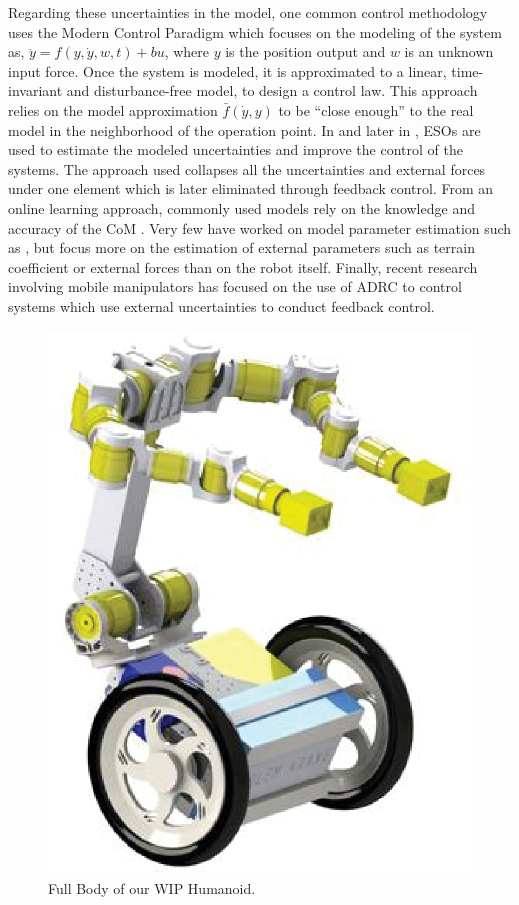 \documentclass[letterpaper, 10 pt, conference]{ieeeconf}  %
\begin{document}
Regarding these uncertainties in the model, one common control methodology uses the Modern Control Paradigm \cite{Gao2006} which focuses on the modeling of the system as, $\ddot{y} = f(y,\dot{y},w,t) + bu$, where $y$ is the position output and $w$ is an unknown input force. Once the system is modeled, it is approximated to a linear, time-invariant and disturbance-free model, to design a control law. This approach relies on the model approximation $\bar{f}(\dot{y},y)$ to be ``close enough'' to the real model in the neighborhood of the operation point. In \cite{Gao2006} and later in \cite{canete2012disturbance}, \acp{ESO} are used to estimate the modeled uncertainties and improve the control of the systems. The approach used collapses all the uncertainties and external forces under one element which is later eliminated through feedback control.  From an online learning approach, commonly used models rely on the knowledge and accuracy of the \ac{CoM} \cite{Luo2012,Chen2017,Yang2016}. Very few have worked on model parameter estimation such as \cite{Kim2016,Jamone2014}, but focus more on the estimation of external parameters such as terrain coefficient or external forces than on the robot itself. Finally, recent research involving mobile manipulators has focused on the use of \ac{ADRC} \cite{Jiang2016,Ruan2014,Wei2017} to control systems which use external uncertainties to conduct feedback control.

\begin{figure}[t]
	\centering
	\includegraphics[width=0.4\columnwidth, clip]{figs/System1.eps}
	\vspace{-0.5\baselineskip}
   \caption{Full Body of our WIP Humanoid.}
   \label{fig: system1}
\end{figure}
\end{document}
